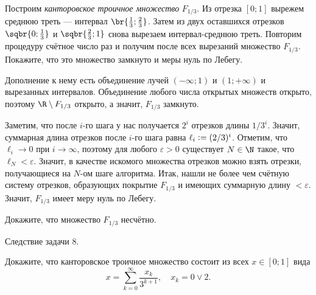 \begin{problem}[6$^\circ$]
    Построим \textit{канторовское троичное множество} $F_{1 / 3}$. Из отрезка $[0; 1]$ вырежем среднюю треть --- интервал $\br{\frac{1}{3}; \frac{2}{3}}$. Затем из двух оставшихся отрезков $\sqbr{0; \frac{1}{3}}$ и $\sqbr{\frac{2}{3}; 1}$ снова вырезаем интервал-среднюю треть. Повторим процедуру счётное число раз и получим после всех вырезаний множество $F_{1 / 3}$. Покажите, что это множество замкнуто и меры нуль по Лебегу.
\end{problem}

\begin{solution}
    Дополнение к нему есть объединение лучей $(-\infty; 1)$ и $(1; +\infty)$ и вырезанных интервалов. Объединение любого числа открытых множеств открыто, поэтому $\R \setminus F_{1 / 3}$ открыто, а значит, $F_{1 / 3}$ замкнуто.

    Заметим, что после $i$-го шага у нас получается $2^i$ отрезков длины $1 / 3^i$. Значит, суммарная длина отрезков после $i$-го шага равна $\ell_i \vcentcolon = (2 / 3)^i$. Отметим, что $\ell_i \to 0$ при $i \to \infty$, поэтому для любого $\varepsilon > 0$ существует $N \in \N$ такое, что $\ell_N < \varepsilon$. Значит, в качестве искомого множества отрезков можно взять отрезки, получающиеся на $N$-ом шаге алгоритма. Итак, нашли не более чем счётную систему отрезков, образующих покрытие $F_{1 / 3}$ и имеющих суммарную длину $< \varepsilon$. Значит, $F_{1 / 3}$ имеет меру нуль по Лебегу.
\end{solution}

\begin{problem}[7]
    Докажите, что множество $F_{1 / 3}$ несчётно.
\end{problem}

\begin{solution}
    Следствие задачи 8.
\end{solution}

\begin{problem}[8]
    Докажите, что канторовское троичное множество состоит из всех $x \in [0; 1]$ вида
    \[
        x = \sum_{k = 0}^\infty \frac{x_k}{3^{k + 1}},\quad x_k = 0 \vee 2.
    \]
\end{problem}


